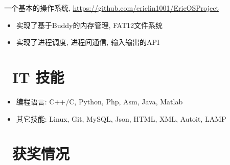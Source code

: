 \documentclass{resume}
\begin{document}
一个基本的操作系统, \url{https://github.com/ericlin1001/EricOSProject}
\begin{itemize}
	\item 实现了基于Buddy的内存管理, FAT12文件系统
	\item 实现了进程调度, 进程间通信, 输入输出的API
\end{itemize}



\section{\faCogs\ IT 技能}
\begin{itemize}[parsep=0.5ex]
	\item 编程语言: C++/C, Python, Php, Asm, Java, Matlab
	\item 其它技能: Linux, Git, MySQL, Json, HTML, XML, Autoit, LAMP
\end{itemize}

\section{\faHeartO\ 获奖情况}
\end{document}
